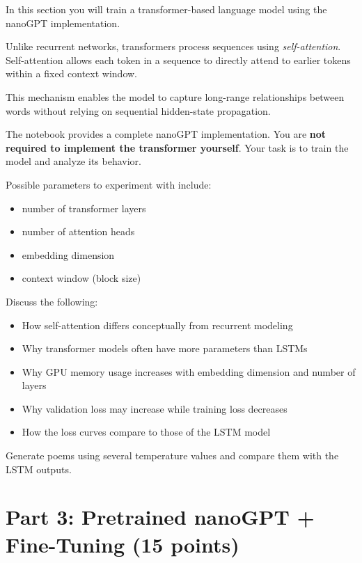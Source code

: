 In this section you will train a transformer-based language model using the
nanoGPT implementation.

Unlike recurrent networks, transformers process sequences using
\emph{self-attention}. Self-attention allows each token in a sequence to
directly attend to earlier tokens within a fixed context window.

This mechanism enables the model to capture long-range relationships between
words without relying on sequential hidden-state propagation.

The notebook provides a complete nanoGPT implementation. You are \textbf{not
required to implement the transformer yourself}. Your task is to train the
model and analyze its behavior.

Possible parameters to experiment with include:

\begin{itemize}
\item number of transformer layers
\item number of attention heads
\item embedding dimension
\item context window (block size)
\end{itemize}

\begin{solution}

Discuss the following:

\begin{itemize}

\item How self-attention differs conceptually from recurrent modeling
\item Why transformer models often have more parameters than LSTMs
\item Why GPU memory usage increases with embedding dimension and number of layers
\item Why validation loss may increase while training loss decreases
\item How the loss curves compare to those of the LSTM model

\end{itemize}

Generate poems using several temperature values and compare them with the
LSTM outputs.

\end{solution}

\section{Part 3: Pretrained nanoGPT + Fine-Tuning (15 points)}

